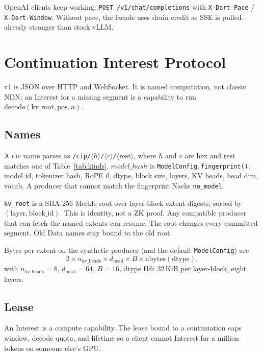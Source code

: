 \documentclass{article}
\theoremstyle{definition}
\newcommand{\cip}{\textsc{cip}}
\begin{document}
OpenAI clients keep working: \texttt{POST /v1/chat/completions} with \texttt{X-Dart-Pace} / \texttt{X-Dart-Window}.
Without pace, the facade uses drain credit as SSE is pulled---already stronger than stock vLLM.

\section{Continuation Interest Protocol}
\label{sec:cip}

v1 is JSON over HTTP and WebSocket.
It is named computation, not classic NDN: an Interest for a missing segment is a capability to run $\mathrm{decode}(\mathrm{kv\_root}, \mathrm{pos}, n)$.

\subsection{Names}

A \cip{} name parses as \texttt{/cip/}$\langle h\rangle$\texttt{/}$\langle r\rangle$\texttt{/}$\langle\mathrm{rest}\rangle$, where $h$ and $r$ are hex and $\mathrm{rest}$ matches one of Table~\ref{tab:kinds}.
$model\_hash$ is \texttt{ModelConfig.fingerprint()}: model id, tokenizer hash, RoPE $\theta$, dtype, block size, layers, KV heads, head dim, vocab.
A producer that cannot match the fingerprint Nacks \texttt{no\_model}.

\texttt{kv\_root} is a SHA-256 Merkle root over layer-block extent digests, sorted by $(\mathrm{layer}, \mathrm{block\_id})$.
This is identity, not a ZK proof.
Any compatible producer that can fetch the named extents can resume.
The root changes every committed segment.
Old Data names stay bound to the old root.

Bytes per extent on the synthetic producer (and the default \texttt{ModelConfig}) are
\begin{equation}
2 \times n_{\mathrm{kv\_heads}} \times d_{\mathrm{head}} \times B \times \mathrm{nbytes}(\mathrm{dtype}),
\end{equation}
with $n_{\mathrm{kv\_heads}}{=}8$, $d_{\mathrm{head}}{=}64$, $B{=}16$, dtype f16: 32\,KiB per layer-block, eight layers.

\subsection{Lease}
\label{sec:lease}

An Interest is a compute capability.
The lease bound to a continuation caps window, decode quota, and lifetime so a client cannot Interest for a million tokens on someone else's GPU.
\end{document}
